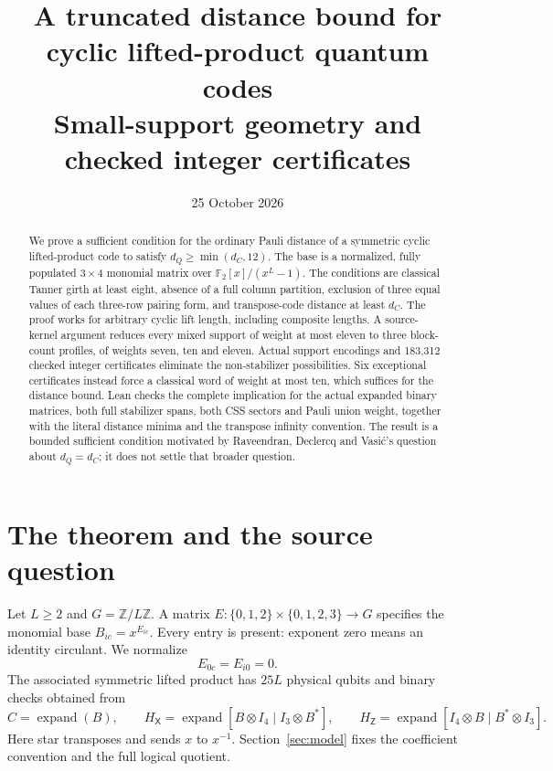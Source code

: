 \documentclass[11pt]{article}
\title{A truncated distance bound for cyclic lifted-product quantum codes\\
Small-support geometry and checked integer certificates}
\author{}
\date{25 October 2026}
\theoremstyle{definition}\newtheorem{definition}[theorem]{Definition}
\newcommand{\F}{\mathbb F_2}\newcommand{\Z}{\mathbb Z}
\newcommand{\HX}{H_{\mathsf X}}\newcommand{\HZ}{H_{\mathsf Z}}
\begin{document}
\maketitle
\begin{abstract}
We prove a sufficient condition for the ordinary Pauli distance of a symmetric
cyclic lifted-product code to satisfy $d_Q\geq\min(d_C,12)$.
The base is a normalized, fully populated $3\times4$ monomial matrix over
$\F[x]/(x^L-1)$. The conditions are classical Tanner girth at least eight,
absence of a full column partition, exclusion of three equal values of each
three-row pairing form, and transpose-code distance at least $d_C$.
The proof works for arbitrary cyclic lift length, including composite lengths.
A source-kernel argument reduces every mixed support of weight at most eleven
to three block-count profiles, of weights seven, ten and eleven.
Actual support encodings and 183,312 checked integer certificates eliminate
the non-stabilizer possibilities. Six exceptional certificates instead force
a classical word of weight at most ten, which suffices for the distance bound.
Lean checks the complete implication for the actual expanded binary matrices,
both full stabilizer spans, both CSS sectors and Pauli union weight, together
with the literal distance minima and the transpose infinity convention.
The result is a bounded sufficient condition motivated by Raveendran,
Declercq and Vasi\'c's question about $d_Q=d_C$; it does not settle that broader
question.
\end{abstract}

\section{The theorem and the source question}\label{sec:answer}
Let $L\geq2$ and $G=\Z/L\Z$. A matrix
$E:\{0,1,2\}\times\{0,1,2,3\}\to G$ specifies the monomial base
$B_{ic}=x^{E_{ic}}$. Every entry is present: exponent zero means an identity
circulant. We normalize
\begin{equation}\label{eq:normal}
 E_{0c}=E_{i0}=0.
\end{equation}
The associated symmetric lifted product has $25L$ physical qubits and
binary checks obtained from
\begin{equation}\label{eq:source}
 C=\operatorname{expand}(B),\qquad
 \HX=\operatorname{expand}[B\otimes I_4\mid I_3\otimes B^*],\qquad
 \HZ=\operatorname{expand}[I_4\otimes B\mid B^*\otimes I_3].
\end{equation}
Here star transposes and sends $x$ to $x^{-1}$. Section~\ref{sec:model}
fixes the coefficient convention and the full logical quotient.
\end{document}
